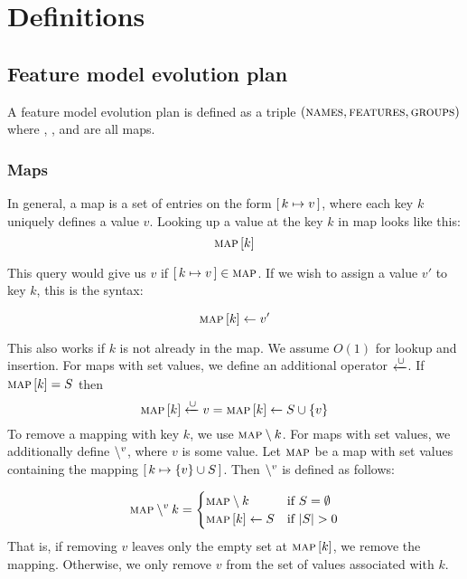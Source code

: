\section{Definitions}

\subsection{Feature model evolution plan}
\label{sub:feature-model-evolution-plan}
A feature model evolution plan is defined as a triple $(\textsc{names}, \textsc{features}, \textsc{groups}{})$ where \names, \features, and \groups{} are all maps.

\subsubsection{Maps}
\label{subsub:maps}


In general, a map is a set of entries on the form $[ \,k \mapsto v\, ]$, where each key $k$ uniquely defines a value $v$. Looking up a value at the key $k$ in map  looks like this:
\[
  \textsc{map} \left[ k \right]
\]

This query would give us $v$ if $[ \,k \mapsto v\, ] \in \textsc{map}$. If we wish to assign a value $v'$ to key $k$, this is the syntax:

\[
\textsc{map} \left[ k \right] \leftarrow v'
\]

This also works if $k$ is not already in the map. We assume $O(1)$ for lookup and insertion. For maps with set values, we define an additional operator $\xleftarrow{\cup}$. If $\textsc{map} \left[ k \right] = S$ then 
\[\textsc{map} \left[ k \right] \xleftarrow{\cup} v = \textsc{map} \left[ k \right] \leftarrow S \cup \{v\}\]
To remove a mapping with key $k$, we use $\textsc{map} \setminus k$. For maps with set values, we additionally define $\setminus^{v}$, where $v$ is some value. Let $\textsc{map}$ be a map with set values containing the mapping $[ \,k \mapsto \{v\} \cup S\, ]$. Then $\setminus^{v}$ is defined as follows:

\[
  \textsc{map} \setminus^{v} k =
  \begin{cases}
    \textsc{map} \setminus k & \text{if } S = \emptyset\\
    \textsc{map} \left[ k \right] \leftarrow S & \text{if } |S| > 0
  \end{cases}
\]
That is, if removing $v$ leaves only the empty set at $\textsc{map} \left[ k \right]$, we remove the mapping. Otherwise, we only remove $v$ from the set of values associated with $k$. 


